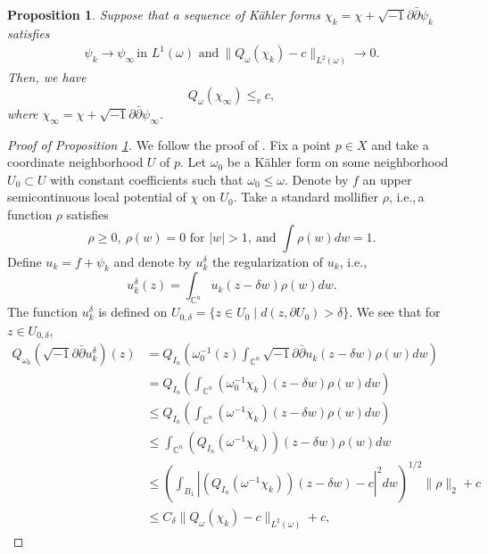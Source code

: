 \documentclass{amsart}
\numberwithin{equation}{section}
\theoremstyle{plain}
\newtheorem{prop}[equation]{Proposition}
\theoremstyle{definition}
\theoremstyle{remark}
\newcommand{\delb}{\sqrt{-1}\partial\bar{\partial}}
\begin{document}
\begin{prop}\label{propvsub}
    Suppose that a sequence of K{\"a}hler forms $\chi_k=\chi+\delb\psi_k$ satisfies
    \begin{align*}
        \psi_k \rightarrow \psi_\infty \, \text{in $L^1(\omega)$ and} \ 
        \|Q_\omega(\chi_k)-c\|_{L^2(\omega)} \rightarrow 0.    
    \end{align*}
    Then, we have
    $$Q_\omega(\chi_\infty)\le_v c,$$
    where $\chi_\infty =\chi+\delb\psi_\infty$.
\end{prop}

\begin{proof}[Proof of Proposition \ref{propvsub}]
    We follow the proof of \cite[Proposition 21]{CS17}. 
    Fix a point $p \in X$ and take a coordinate neighborhood $U$ of $p$. Let $\omega_0$ be a K{\"a}hler form on some neighborhood $U_0 \subset U$ with constant coefficients such that $\omega_0 \le \omega$. Denote by $f$ an upper semicontinuous local potential of $\chi$ on $U_0$. Take a standard mollifier $\rho$, i.e.,\,a function $\rho$ satisfies $$\rho\ge0, \ \rho(w)=0 \text{ for $|w|>1$},\ \text{and } \int\rho(w)dw=1.$$ Define $u_k=f+\psi_k$ and denote by $u^\delta_k$ the regularization of $u_k$, i.e.,
    \begin{equation*}
        u^\delta_k(z)=\int_{\mathbb{C}^n} u_k(z-\delta w)\rho(w)dw.
    \end{equation*}
    The function $u^\delta_k$ is defined on $U_{0,\delta} =\{z\in U_0\mid d(z,\partial U_0)> \delta \}.$
    We see that for $z \in U_{0,\delta}$,
    \begin{equation}\label{eqregularization}
        \begin{split}
        Q_{\omega_0}(\delb u^\delta_k)(z)
        &=Q_{I_n}\left(\omega^{-1}_0(z) \int_{\mathbb{C}^n}\delb u_k(z-\delta w)\rho(w)dw
        \right)\\
        &=Q_{I_n}\left( \int_{\mathbb{C}^n}(\omega^{-1}_0 \chi_k)(z-\delta w)\rho(w)dw
        \right)\\
        &\le Q_{I_n}\left( \int_{\mathbb{C}^n}(\omega^{-1} \chi_k)(z-\delta w)\rho(w)dw
        \right)\\
        &\le \int_{\mathbb{C}^n}\left(Q_{I_n}(\omega^{-1}\chi_k)\right)(z-\delta w)\rho(w)dw\\
        &\le \left(\int_{B_1}\left|\left(Q_{I_n}(\omega^{-1}\chi_k)\right)(z-\delta w)-c\right|^2 dw\right)^{1/2}\|\rho\|_2 +c\\
        &\le C_\delta \|Q_\omega(\chi_k)-c\|_{L^2(\omega)} +c,
        \end{split}

\end{equation}
\end{proof}
\end{document}
